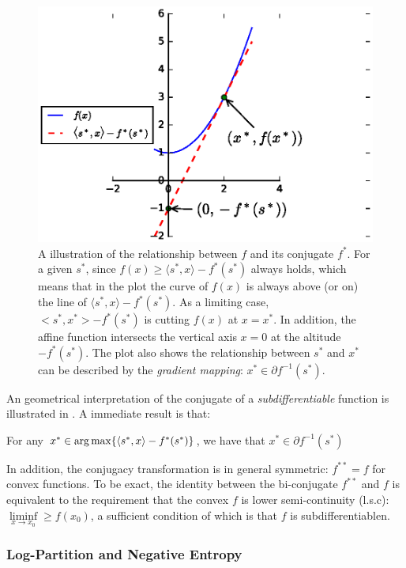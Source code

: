\begin{figure}[h!]
  \centering
  \includegraphics[width=0.7\linewidth, trim={0 0 3cm 1.5cm},
                    clip]{figures/conjugate-function.eps}

  \caption{A illustration of the relationship between $f$ and its conjugate
    $f^*$. For a given $s^*$, since $f(x) \geq \langle s^*, x \rangle  -
    f^*(s^*)$ always holds, which means that in the plot the curve of $f(x)$ is
    always above (or on) the line of $\langle s^*, x \rangle  - f^*(s^*)$. As a
    limiting case, $<s^*, x^*> - f^*(s^*)$ is cutting $f(x)$ at $x = x^*$. In
    addition, the affine function intersects the vertical axis $x = 0$ at the
    altitude $-f^*(s^*)$. The plot also shows the relationship between $s^*$ and
    $x^*$ can be described by the \emph{gradient mapping}: $x^* \in \partial
    f^{-1}(s^*)$.}

  \label{fig::conjugate-function}
\end{figure}

An geometrical interpretation of the conjugate of a \emph{subdifferentiable}
function is illustrated in . A immediate
result is that:

\begin{thm} \label{thm::conjugate-attainer}
For any $x^* \in \operatorname*{arg\,max} \{ \langle s^*, x \rangle  - f^*(s^*)
\}$, we have that $x^* \in \partial f^{-1}(s^*)$
\end{thm}

In addition, the conjugacy transformation is in general symmetric: $f^{**} = f$
for convex functions. To be exact, the identity between the bi-conjugate
$f^{**}$ and $f$ is equivalent to the requirement that the convex $f$ is
lower semi-continuity (l.s.c): $\liminf\limits_{x \rightarrow x_0} \geq f(x_0)$,
a sufficient condition of which is that $f$ is subdifferentiablen.

\subsubsection{Log-Partition and Negative Entropy}

